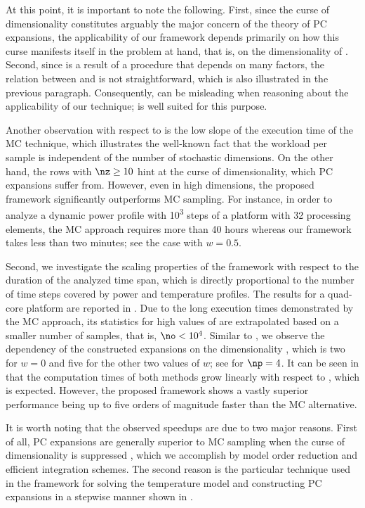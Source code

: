 At this point, it is important to note the following. First, since the curse of
dimensionality constitutes arguably the major concern of the theory of \ac{PC}
expansions, the applicability of our framework depends primarily on how this
curse manifests itself in the problem at hand, that is, on the dimensionality
\nz of \vz. Second, since \vz is a result of a procedure that depends on many
factors, the relation between \vu and \vz is not straightforward, which is also
illustrated in the previous paragraph. Consequently, \nu can be misleading when
reasoning about the applicability of our technique; \nz is well suited for this
purpose.

Another observation with respect to  is the
low slope of the execution time of the \ac{MC} technique, which illustrates the
well-known fact that the workload per sample is independent of the number of
stochastic dimensions. On the other hand, the rows with $\nz \geq 10$ hint at
the curse of dimensionality, which \ac{PC} expansions suffer from. However, even
in high dimensions, the proposed framework significantly outperforms \ac{MC}
sampling. For instance, in order to analyze a dynamic power profile with
10\textsuperscript{3} steps of a platform with 32 processing elements, the
\ac{MC} approach requires more than 40 hours whereas our framework takes less
than two minutes; see the case with $w = 0.5$.

Second, we investigate the scaling properties of the framework with respect to
the duration of the analyzed time span, which is directly proportional to the
number of time steps \ns covered by power and temperature profiles. The results
for a quad-core platform are reported in . Due
to the long execution times demonstrated by the \ac{MC} approach, its statistics
for high values of \ns are extrapolated based on a smaller number of samples,
that is, $\no < 10^4$. Similar to , we
observe the dependency of the constructed expansions on the dimensionality \nz,
which is two for $w = 0$ and five for the other two values of $w$; see
 for $\np = 4$. It can be seen in
 that the computation times of both methods
grow linearly with respect to \ns, which is expected. However, the proposed
framework shows a vastly superior performance being up to five orders of
magnitude faster than the \ac{MC} alternative.

It is worth noting that the observed speedups are due to two major reasons.
First of all, \ac{PC} expansions are generally superior to \ac{MC} sampling when
the curse of dimensionality is suppressed \cite{eldred2008, xiu2010}, which we
accomplish by model order reduction and efficient integration schemes. The
second reason is the particular technique used in the framework for solving the
temperature model and constructing \ac{PC} expansions in a stepwise manner shown
in .
